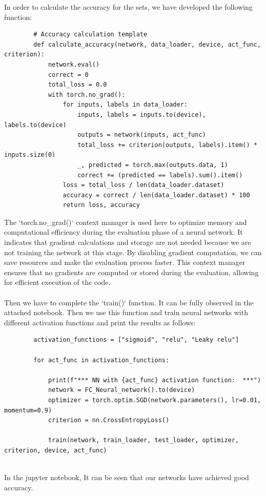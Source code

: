 \documentclass[]{article}
\begin{document}
	In order to calculate the accuracy for the sets, we have developed the following function:
	\begin{lstlisting}
		# Accuracy calculation template
		def calculate_accuracy(network, data_loader, device, act_func, criterion):
			network.eval()
			correct = 0
			total_loss = 0.0
			with torch.no_grad():
				for inputs, labels in data_loader:
					inputs, labels = inputs.to(device), labels.to(device)
					outputs = network(inputs, act_func)
					total_loss += criterion(outputs, labels).item() * inputs.size(0)
					_, predicted = torch.max(outputs.data, 1)
					correct += (predicted == labels).sum().item()
				loss = total_loss / len(data_loader.dataset)
				accuracy = correct / len(data_loader.dataset) * 100
				return loss, accuracy
	\end{lstlisting}
	The `torch.no\_grad()` context manager is used here to optimize memory and computational efficiency during the evaluation phase of a neural network. It indicates that gradient calculations and storage are not needed because we are not training the network at this stage. By disabling gradient computation, we can save resources and make the evaluation process faster. This context manager ensures that no gradients are computed or stored during the evaluation, allowing for efficient execution of the code.\\\\
	Then we have to complete the `train()` function. It can be fully observed in the attached notebook. Then we use this function and train neural networks with different activation functions and print the results as follows:
	\begin{lstlisting}
		activation_functions = ["sigmoid", "relu", "Leaky relu"]
		
		for act_func in activation_functions:
		
			print(f"*** NN with {act_func} activation function:  ***")
			network = FC_Neural_network().to(device)
			optimizer = torch.optim.SGD(network.parameters(), lr=0.01, momentum=0.9)
			criterion = nn.CrossEntropyLoss()
			
			train(network, train_loader, test_loader, optimizer, criterion, device, act_func)
		
	\end{lstlisting}
	In the jupyter notebook, It can be seen that our networks have achieved good accuracy. 
	
\end{document}
